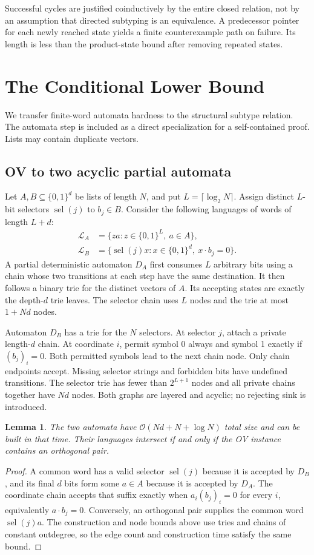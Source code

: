 \documentclass[11pt,letterpaper]{article}
\newtheorem{lemma}[theorem]{Lemma}
\theoremstyle{definition}\newtheorem{definition}[theorem]{Definition}
\newcommand{\Oh}{\mathcal O}
\newcommand{\bits}{\{0,1\}}
\begin{document}
Successful cycles are justified coinductively by the entire closed relation, not by an assumption that directed subtyping is an equivalence. A predecessor pointer for each newly reached state yields a finite counterexample path on failure. Its length is less than the product-state bound after removing repeated states.


\section{The Conditional Lower Bound}\label{sec:lower}
We transfer finite-word automata hardness to the structural subtype relation. The automata step is included as a direct specialization for a self-contained proof. Lists may contain duplicate vectors.

\subsection{OV to two acyclic partial automata}
Let $A,B\subseteq\bits^d$ be lists of length $N$, and put $L=\lceil\log_2 N\rceil$. Assign distinct $L$-bit selectors $\operatorname{sel}(j)$ to $b_j\in B$. Consider the following languages of words of length $L+d$:
\begin{align*}
\mathcal L_A&=\{za: z\in\bits^L,\ a\in A\},\\
\mathcal L_B&=\{\operatorname{sel}(j)x: x\in\bits^d,\ x\cdot b_j=0\}.
\end{align*}
A partial deterministic automaton $D_A$ first consumes $L$ arbitrary bits using a chain whose two transitions at each step have the same destination. It then follows a binary trie for the distinct vectors of $A$. Its accepting states are exactly the depth-$d$ trie leaves. The selector chain uses $L$ nodes and the trie at most $1+Nd$ nodes.

Automaton $D_B$ has a trie for the $N$ selectors. At selector $j$, attach a private length-$d$ chain. At coordinate $i$, permit symbol 0 always and symbol 1 exactly if $(b_j)_i=0$. Both permitted symbols lead to the next chain node. Only chain endpoints accept. Missing selector strings and forbidden bits have undefined transitions. The selector trie has fewer than $2^{L+1}$ nodes and all private chains together have $Nd$ nodes. Both graphs are layered and acyclic; no rejecting sink is introduced.

\begin{lemma}\label{lem:ovdfa}
The two automata have $\Oh(Nd+N+\log N)$ total size and can be built in that time. Their languages intersect if and only if the OV instance contains an orthogonal pair.
\end{lemma}
\begin{proof}
A common word has a valid selector $\operatorname{sel}(j)$ because it is accepted by $D_B$, and its final $d$ bits form some $a\in A$ because it is accepted by $D_A$. The coordinate chain accepts that suffix exactly when $a_i(b_j)_i=0$ for every $i$, equivalently $a\cdot b_j=0$. Conversely, an orthogonal pair supplies the common word $\operatorname{sel}(j)a$. The construction and node bounds above use tries and chains of constant outdegree, so the edge count and construction time satisfy the same bound.
\end{proof}
\end{document}

